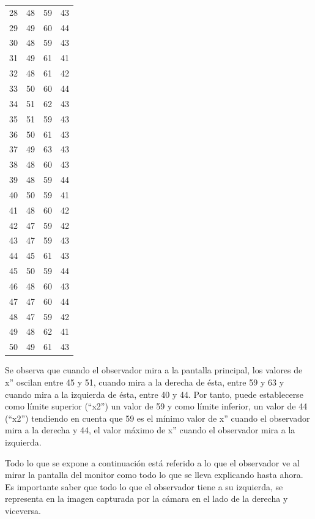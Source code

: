 \begin{longtable}{c|c|c|c}
     28 & 48 & 59 & 43 \\
     29 & 49 & 60 & 44 \\
     30 & 48 & 59 & 43 \\ 
     31 & 49 & 61 & 41 \\ 
     32 & 48 & 61 & 42 \\ 
     33 & 50 & 60 & 44 \\ 
     34 & 51 & 62 & 43 \\ 
     35 & 51 & 59 & 43 \\ 
     36 & 50 & 61 & 43 \\ 
     37 & 49 & 63 & 43 \\ 
     38 & 48 & 60 & 43 \\ 
     39 & 48 & 59 & 44 \\ 
     40 & 50 & 59 & 41 \\ 
     41 & 48 & 60 & 42 \\ 
     42 & 47 & 59 & 42 \\ 
     43 & 47 & 59 & 43 \\ 
     44 & 45 & 61 & 43 \\ 
     45 & 50 & 59 & 44 \\ 
     46 & 48 & 60 & 43 \\ 
     47 & 47 & 60 & 44 \\ 
     48 & 47 & 59 & 42 \\ 
     49 & 48 & 62 & 41 \\ 
     50 & 49 & 61 & 43 \\ \hline
\end{longtable}

Se observa que cuando el observador mira a la pantalla principal, los valores de x'' oscilan entre 45 y 51, cuando mira a la derecha de ésta, entre 59 y 63 y cuando mira a la izquierda de ésta, entre 40 y 44. Por tanto, puede establecerse como límite superior (``x2'') un valor de 59 y como límite inferior, un valor de 44 (``x2'') tendiendo en cuenta que 59 es el mínimo valor de x'' cuando el observador mira a la derecha y 44, el valor máximo de x'' cuando el observador mira a la izquierda.

Todo lo que se expone a continuación está referido a lo que el observador ve al mirar la pantalla del monitor como todo lo que se lleva explicando hasta ahora. Es importante saber que todo lo que el observador tiene a su izquierda, se representa en la imagen capturada por la cámara en el lado de la derecha y viceversa. 

